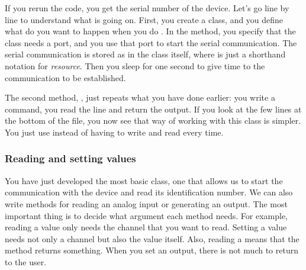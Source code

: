 If you rerun the code, you get the serial number of the device. Let's go line by line to understand what is going on. First, you create a class, and you define what do you want to happen when you do . In the  method, you specify that the class needs a port, and you use that port to start the serial communication. The serial communication is stored as  in the class itself, where  is just a shorthand notation for \textit{resource}. Then you sleep for one second to give time to the communication to be established.

The second method, , just repeats what you have done earlier: you write a command, you read the line and return the output. If you look at the few lines at the bottom of the file, you now see that way of working with this class is simpler. You just use  instead of having to write and read every time.



\subsubsection{Reading and setting values}
You have just developed the most basic class, one that allows us to start the communication with the device and read its identification number. We can also write methods for reading an analog input or generating an output. The most important thing is to decide what argument each method needs. For example, reading a value only needs the channel that you want to read. Setting a value needs not only a channel but also the value itself. Also, reading a means that the method returns something. When you set an output, there is not much to return to the user.


